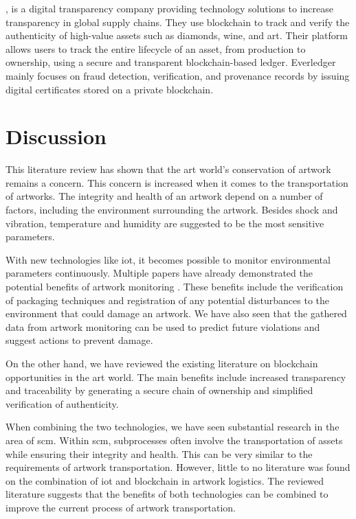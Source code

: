 \textcite{everledger}, is a digital transparency company providing technology solutions to increase transparency in global supply chains. They use blockchain to track and verify the authenticity of high-value assets such as diamonds, wine, and art. Their platform allows users to track the entire lifecycle of an asset, from production to ownership, using a secure and transparent blockchain-based ledger. Everledger mainly focuses on fraud detection, verification, and provenance records by issuing digital certificates stored on a private blockchain.

\section{Discussion}
\label{sec:related_work_discussion}
This literature review has shown that the art world's conservation of artwork remains a concern. This concern is increased when it comes to the transportation of artworks. The integrity and health of an artwork depend on a number of factors, including the environment surrounding the artwork. Besides shock and vibration, temperature and humidity are suggested to be the most sensitive parameters.

With new technologies like \gls{iot}, it becomes possible to monitor environmental parameters continuously. Multiple papers have already demonstrated the potential benefits of artwork monitoring \cite{pactart, riskmonitoring, woodenartworkmonitoring, shockvibrationtransit}. These benefits include the verification of packaging techniques and registration of any potential disturbances to the environment that could damage an artwork. We have also seen that the gathered data from artwork monitoring can be used to predict future violations and suggest actions to prevent damage.

On the other hand, we have reviewed the existing literature on blockchain opportunities in the art world. The main benefits include increased transparency and traceability by generating a secure chain of ownership and simplified verification of authenticity.

When combining the two technologies, we have seen substantial research in the area of \gls{scm}. Within \gls{scm}, subprocesses often involve the transportation of assets while ensuring their integrity and health. This can be very similar to the requirements of artwork transportation. However, little to no literature was found on the combination of \gls{iot} and blockchain in artwork logistics. The reviewed literature suggests that the benefits of both technologies can be combined to improve the current process of artwork transportation.
